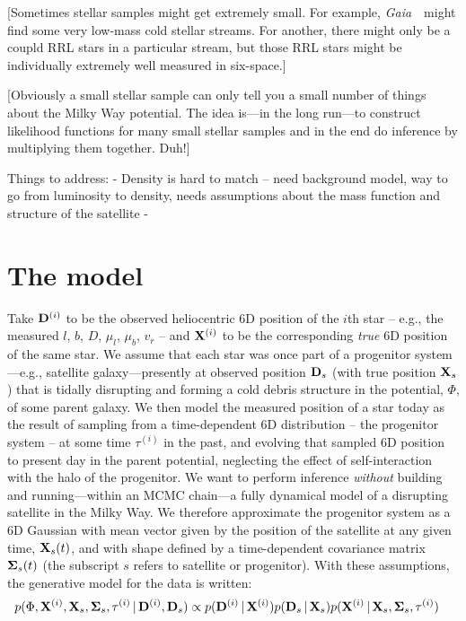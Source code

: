\documentclass[letterpaper,12pt,preprint]{aastex}
\newcommand{\project}[1]{\textsl{#1}}
\newcommand{\gaia}{\project{Gaia}~}
\newcommand{\given}{\,|\,}
\newcommand{\D}{{\bf D}}
\newcommand{\X}{{\bf X}}
\newcommand{\bSigma}{{\bf \Sigma}}
\begin{document}
[Sometimes stellar samples might get extremely small.  For example,
  \gaia\ might find some very low-mass cold stellar streams.  For
  another, there might only be a coupld RRL stars in a particular
  stream, but those RRL stars might be individually extremely well
  measured in six-space.]

[Obviously a small stellar sample can only tell you a small number of
  things about the Milky Way potential.  The idea is---in the long
  run---to construct likelihood functions for many small stellar
  samples and in the end do inference by multiplying them together.
  Duh!]
  
Things to address:
- Density is hard to match -- need background model, way to go from luminosity to density, needs assumptions about the mass function and structure of the satellite
-

\section{The model}

Take ${\bf D}^{(i)}$ to be the observed heliocentric 6D position of the $i$th star -- e.g., the measured $l$, $b$, $D$, $\mu_l$, $\mu_b$, $v_r$ -- and ${\bf X}^{(i)}$ to be the corresponding \emph{true} 6D position of the same star. We assume that each star was once part of a progenitor system---e.g., satellite galaxy---presently at observed position ${\bf D}_s$ (with true position ${\bf X}_s$) that is tidally disrupting and forming a cold debris structure in the potential, $\Phi$, of some parent galaxy. We then model the measured position of a star today as the result of sampling from a time-dependent 6D distribution -- the progenitor system -- at some time $\tau^{(i)}$ in the past, and evolving that sampled 6D position to present day in the parent potential, neglecting the effect of self-interaction with the halo of the progenitor. We want to perform inference \emph{without} building and running---within an MCMC chain---a fully dynamical model of a disrupting satellite in the Milky Way. We therefore approximate the progenitor system as a 6D Gaussian with mean vector given by the position of the satellite at any given time, ${\bf X}_s(t)$, and with shape defined by a time-dependent covariance matrix $\bSigma_s(t)$ (the subscript $s$ refers to satellite or progenitor). With these assumptions, the generative model for the data is written:
\begin{align}
	p(\Phi, \X^{(i)}, \X_s, \bSigma_s, \tau^{(i)} \given \D^{(i)}, \D_s) &\propto 
		p(\D^{(i)} \given \X^{(i)}) p(\D_s \given \X_s) p(\X^{(i)} \given \X_s, \bSigma_s, \tau^{(i)})
\end{align}
\end{document}
